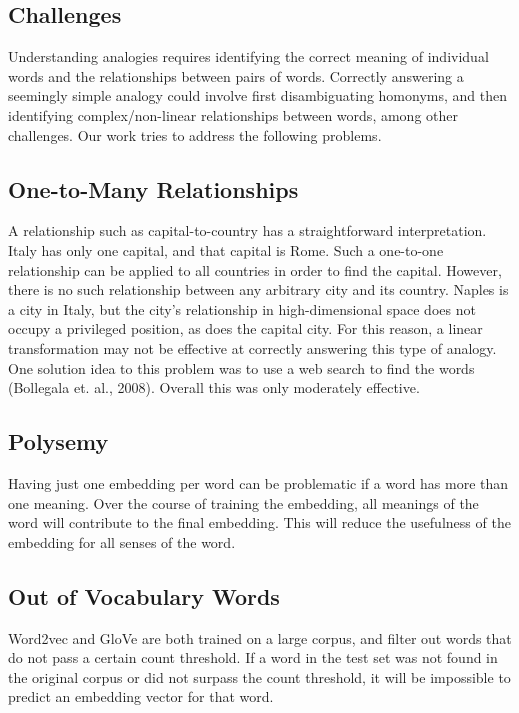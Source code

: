 \documentclass[11pt]{article}
\begin{document}
\subsection{Challenges}

Understanding analogies requires identifying the correct meaning of
individual words and the relationships between pairs of words. Correctly
answering a seemingly simple analogy could involve first disambiguating
homonyms, and then identifying complex/non-linear relationships between
words, among other challenges. Our work tries to address the following
problems.

\subsection{One-to-Many Relationships}

A relationship such as capital-to-country has a straightforward
interpretation. Italy has only one capital, and that capital is Rome.
Such a one-to-one relationship can be applied to all countries in order
to find the capital. However, there is no such relationship between any
arbitrary city and its country. Naples is a city in Italy, but the
city's relationship in high-dimensional space does not occupy a
privileged position, as does the capital city. For this reason, a linear
transformation may not be effective at correctly answering this type of
analogy. One solution idea to this problem was to use a web search to
find the words (Bollegala et. al., 2008). Overall this was only
moderately effective.

\subsection{Polysemy}

Having just one embedding per word can be problematic if a word has more
than one meaning. Over the course of training the embedding, all
meanings of the word will contribute to the final embedding. This will
reduce the usefulness of the embedding for all senses of the word.

\subsection{Out of Vocabulary Words}

Word2vec and GloVe are both trained on a large corpus, and filter out
words that do not pass a certain count threshold. If a word in the test
set was not found in the original corpus or did not surpass the count
threshold, it will be impossible to predict an embedding vector for that
word.
\end{document}
